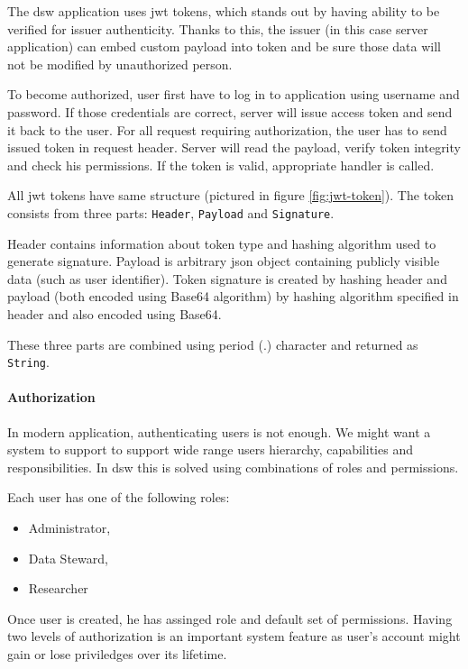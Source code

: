 The \gls{dsw} application uses \gls{jwt} tokens, which stands out by having ability to be verified for issuer authenticity.
Thanks to this, the issuer (in this case server application) can embed custom payload into token and be sure those data will not be modified by unauthorized person.

To become authorized, user first have to log in to application using username and password.
If those credentials are correct, server will issue access token and send it back to the user.
For all request requiring authorization, the user has to send issued token in request header.
Server will read the payload, verify token integrity and check his permissions.
If the token is valid, appropriate handler is called.

All \gls{jwt} tokens have same structure (pictured in figure \ref{fig:jwt-token}).
The token consists from three parts: \texttt{Header}, \texttt{Payload} and \texttt{Signature}.


Header contains information about token type and hashing algorithm used to generate signature.
Payload is arbitrary \gls{json} object containing publicly visible data (such as user identifier).
Token signature is created by hashing header and payload (both encoded using Base64 algorithm) by hashing algorithm specified in header and also encoded using Base64.

These three parts are combined using period (.) character and returned as \texttt{String}.

\paragraph*{Authorization}

In modern application, authenticating users is not enough.
We might want a system to support to support wide range users hierarchy, capabilities and responsibilities.
In \gls{dsw} this is solved using combinations of roles and permissions.

Each user has one of the following roles:

\begin{itemize}
    \item Administrator,
    \item Data Steward,
    \item Researcher
\end{itemize}

Once user is created, he has assinged role and default set of permissions.
Having two levels of authorization is an important system feature as user's account might gain or lose priviledges over its lifetime.

